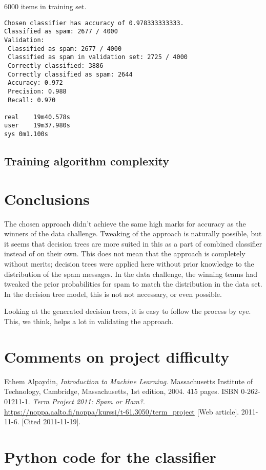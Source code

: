 \documentclass[a4paper,10pt]{article}
\begin{document}
6000 items in training set.

\begin{verbatim}
Chosen classifier has accuracy of 0.978333333333.
Classified as spam: 2677 / 4000
Validation:
 Classified as spam: 2677 / 4000
 Classified as spam in validation set: 2725 / 4000
 Correctly classified: 3886
 Correctly classified as spam: 2644
 Accuracy: 0.972
 Precision: 0.988
 Recall: 0.970

real	19m40.578s
user	19m37.980s
sys	0m1.100s
\end{verbatim}

\subsection{Training algorithm complexity}

\section{Conclusions}

The chosen approach didn't achieve the same high marks for accuracy as
the winners of the data challenge.  Tweaking of the approach is
naturally possible, but it seems that decision trees are more suited in
this as a part of combined classifier instead of on their own.  This
does not mean that the approach is completely without merits; decision
trees were applied here without prior knowledge to the distribution of
the spam messages.  In the data challenge, the winning teams had tweaked
the prior probabilities for spam to match the distribution in the data
set.  In the decision tree model, this is not not necessary, or even
possible.

Looking at the generated decision trees, it is easy to follow the
process by eye.  This, we think, helps a lot in validating the approach.

\section{Comments on project difficulty}

\begin{thebibliography}{9}
  Ethem Alpaydin,
  \emph{Introduction to Machine Learning}.
  Massachusetts Institute of Technology, Cambridge, Massachusetts,
  1st edition,
  2004. 415 pages. ISBN 0-262-01211-1.
  \emph{Term Project 2011: Spam or Ham?}.
  \href{https://noppa.aalto.fi/noppa/kurssi/t-61.3050/term\_project}
  {https://noppa.aalto.fi/noppa/kurssi/t-61.3050/term\_project}
  [Web article]. 2011-11-6. [Cited 2011-11-19].

\end{thebibliography}

\appendix
\section{Python code for the classifier}

\end{document}
